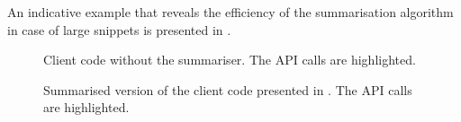 An indicative example that reveals the efficiency of the summarisation algorithm in case of large snippets is presented in .

\begin{figure}[h]

\vspace{-10pt}
\caption[Client code without the summariser]{Client code without the summariser. The API calls are highlighted.}
\label{listings:without-summariser}
\end{figure}

\begin{figure}[h]

\vspace{-10pt}
\caption[Client code with the summariser]{Summarised version of the client code presented in . The API calls are highlighted.}
\label{listings:with-summariser}
\end{figure}